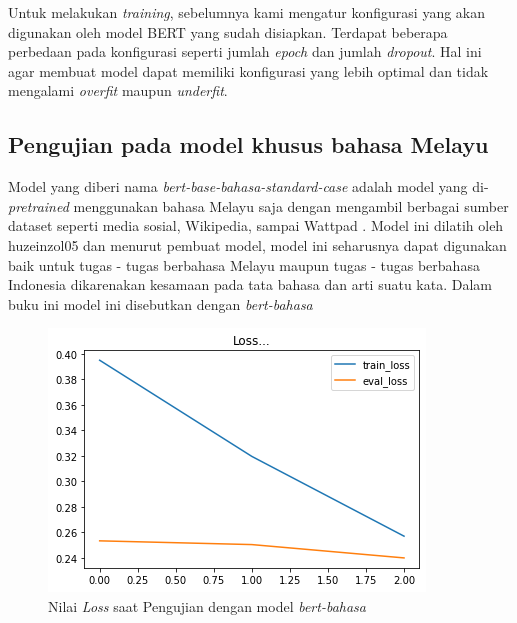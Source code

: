 Untuk melakukan \textit{training}, sebelumnya kami mengatur konfigurasi yang akan digunakan oleh model BERT yang sudah disiapkan. Terdapat beberapa perbedaan pada konfigurasi seperti jumlah \textit{epoch} dan jumlah \textit{dropout}. Hal ini agar membuat model dapat memiliki konfigurasi yang lebih optimal dan tidak mengalami \textit{overfit} maupun \textit{underfit}.

\subsection{Pengujian pada model khusus bahasa Melayu}

Model yang diberi nama \textit{bert-base-bahasa-standard-case} adalah model yang di-\textit{pretrained} menggunakan bahasa Melayu saja dengan mengambil berbagai sumber dataset seperti media sosial, Wikipedia, sampai Wattpad \cite{Malaya}. Model ini dilatih oleh huzeinzol05 dan menurut pembuat model, model ini seharusnya dapat digunakan baik untuk tugas - tugas berbahasa Melayu maupun tugas - tugas berbahasa Indonesia dikarenakan kesamaan pada tata bahasa dan arti suatu kata. Dalam buku ini model ini disebutkan dengan \textit{bert-bahasa}

\begin{figure}[h]
    \begin{center}
        \includegraphics[width= 0.9\linewidth]{gambar/loss_bert_bahasa.png}
        \caption{Nilai \textit{Loss} saat Pengujian dengan model \textit{bert-bahasa}}
        \label{fig: loss_bert_bahasa}
    \end{center}
\end{figure}

